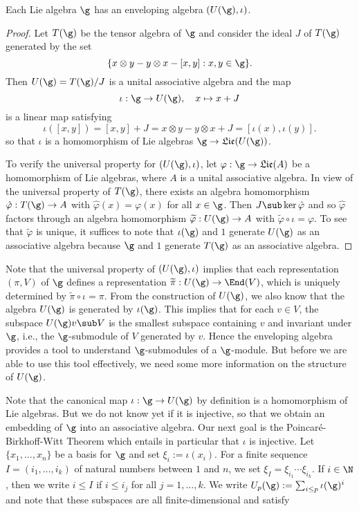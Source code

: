 \begin{proposition}
Each Lie algebra $\g$ has an enveloping algebra $(U(\g),\iota)$.
\end{proposition}
\begin{proof}
Let $T(\g)$ be the tensor algebra of $\g$ and consider the ideal $J$ of $T(\g)$ generated by the set
\[\{x\otimes y-y\otimes x-[x,y]:x,y\in\g\}.\]
Then $U(\g)=T(\g)/J$ is a unital associative algebra and the map
\[\iota:\g\to U(\g),\quad x\mapsto x+J\]
is a linear map satisfying
\[\iota([x,y])=[x,y]+J=x\otimes y-y\otimes x+J=[\iota(x),\iota(y)].\]
so that $\iota$ is a homomorphism of Lie algebras $\g\to\mathfrak{Lie}(U(\g))$.\par
To verify the universal property for $(U(\g),\iota)$, let $\varphi:\g\to \mathfrak{Lie}(A)$ be a homomorphism of Lie algebras, where $A$ is a unital associative algebra. In view of the universal property of $T(\g)$, there exists an algebra homomorphism $\hat{\varphi}:T(\g)\to A$ with $\hat{\varphi}(x)=\varphi(x)$ for all $x\in\g$. Then $J\sub\ker\hat{\varphi}$ and so $\hat{\varphi}$ factors through an algebra homomorphism $\widetilde{\varphi}:U(\g)\to A$ with $\widetilde{\varphi}\circ\iota=\varphi$. To see that $\widetilde{\varphi}$ is unique, it suffices to note that $\iota(\g)$ and $1$ generate $U(\g)$ as an associative algebra because $\g$ and $1$ generate $T(\g)$ as an associative algebra.
\end{proof}
Note that the universal property of $(U(\g),\iota)$ implies that each representation $(\pi,V)$ of $\g$ defines a representation $\widetilde{\pi}:U(\g)\to\End(V)$, which is uniquely determined by $\widetilde{\pi}\circ\iota=\pi$. From the construction of $U(\g)$, we also know that the algebra $U(\g)$ is generated by $\iota(\g)$. This implies that for each $v\in V$, the subspace $U(\g)v\sub V$ is the smallest subspace containing $v$ and invariant under $\g$, i.e., the $\g$-submodule of $V$ generated by $v$. Hence the enveloping algebra provides a tool to understand $\g$-submodules of a $\g$-module. But before we are able to use this tool effectively, we need some more information on the structure of $U(\g)$.\par
Note that the canonical map $\iota:\g\to U(\g)$ by definition is a homomorphism of Lie algebras. But we do not know yet if it is injective, so that we obtain an embedding of $\g$ into an associative algebra. Our next goal is the Poincar\'e-Birkhoff-Witt Theorem which entails in particular that $\iota$ is injective.
Let $\{x_1,\dots,x_n\}$ be a basis for $\g$ and set $\xi_i:=\iota(x_i)$. For a finite sequence $I=(i_1,\dots,i_k)$ of natural numbers between $1$ and $n$, we set $\xi_I=\xi_{i_1}\cdots\xi_{i_k}$. If $i\in\N$, then we write $i\leq I$ if $i\leq i_j$ for all $j=1,\dots,k$. We write $U_p(\g):=\sum_{i\leq p}\iota(\g)^i$ and note that these subspaces are all finite-dimensional and satisfy

